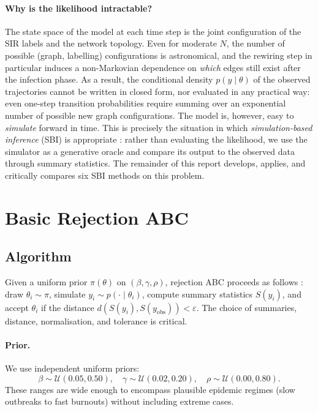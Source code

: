 \documentclass[11pt]{article}
\begin{document}
\paragraph{Why is the likelihood intractable?}
The state space of the model at each time step is the joint configuration of the SIR labels and the network topology. Even for moderate $N$, the number of possible (graph, labelling) configurations is astronomical, and the rewiring step in particular induces a non-Markovian dependence on \emph{which} edges still exist after the infection phase. As a result, the conditional density $p(y \mid \theta)$ of the observed trajectories cannot be written in closed form, nor evaluated in any practical way: even one-step transition probabilities require summing over an exponential number of possible new graph configurations. The model is, however, easy to \emph{simulate} forward in time. This is precisely the situation in which \emph{simulation-based inference} (SBI) is appropriate \citep{cranmer2020frontier}: rather than evaluating the likelihood, we use the simulator as a generative oracle and compare its output to the observed data through summary statistics. The remainder of this report develops, applies, and critically compares six SBI methods on this problem.

\section{Basic Rejection ABC}

\subsection{Algorithm}

Given a uniform prior $\pi(\theta)$ on $(\beta,\gamma,\rho)$, rejection ABC proceeds as follows \citep{pritchard1999population}: draw $\theta_i \sim \pi$, simulate $y_i \sim p(\cdot \mid \theta_i)$, compute summary statistics $S(y_i)$, and accept $\theta_i$ if the distance $d(S(y_i), S(y_{\text{obs}})) < \varepsilon$. The choice of summaries, distance, normalisation, and tolerance is critical.

\paragraph{Prior.} We use independent uniform priors:
\begin{equation*}
\beta \sim \mathcal{U}(0.05, 0.50), \quad \gamma \sim \mathcal{U}(0.02, 0.20), \quad \rho \sim \mathcal{U}(0.00, 0.80).
\end{equation*}
These ranges are wide enough to encompass plausible epidemic regimes (slow outbreaks to fast burnouts) without including extreme cases.
\end{document}

